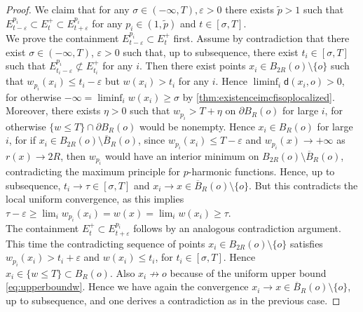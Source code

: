 \documentclass[a4paper,12pt,reqno]{amsart}
\numberwithin{equation}{section}
\theoremstyle{plain}
\theoremstyle{definition}
\theoremstyle{remark}
\newcommand{\eps}{\varepsilon}
\newcommand{\dist}{\mathsf{d}}
\begin{document}
{\begin{proof}
We claim that for any $\sigma \in (-\infty,T), \eps>0$ there exists $\tilde p>1$ such that $E^{p_i}_{t-\eps} \subset E_t^+ \subset E^{p_i}_{t+\eps}$ for any $p_i \in (1,\tilde p)$ and $t \in [\sigma, T]$.\\
We prove the containment $E^{p_i}_{t-\eps} \subset E_t^+$ first. Assume by contradiction that there exist $\sigma \in (-\infty, T)$, $\eps>0$ such that, up to subsequence, there exist $t_i \in [\sigma, T]$ such that $E^{p_i}_{t_i-\eps} \not\subset E_{t_i}^+$ for any $i$. Then there exist points $x_i \in B_{2R}(o) \setminus\{o\}$ such that $w_{p_i}(x_i) \le t_i-\eps$ but $w(x_i)>t_i$ for any $i$. Hence $\liminf_i \dist(x_i,o)>0$, for otherwise $-\infty = \liminf_i w(x_i) \ge \sigma$ by \cref{thm:existenceimcfisoplocalized}. Moreover, there exists $\eta>0$ such that $w_{p_i} > T + \eta$ on $\partial B_R(o)$ for large $i$, for otherwise $\{w \le T\} \cap \partial B_R(o)$ would be nonempty. Hence $x_i \in B_R(o)$ for large $i$, for if $x_i \in B_{2R}(o) \setminus \overline{B}_R(o)$, since $w_{p_i}(x_i) \le T-\eps$ and $w_{p_i}(x)\to+\infty$ as $r(x)\to2R$, then $w_{p_i}$ would have an interior minimum on $B_{2R}(o) \setminus\overline{B}_R(o)$, contradicting the maximum principle for $p$-harmonic functions. Hence, up to subsequence, $t_i\to \tau \in [\sigma, T]$ and $x_i\to x \in \overline{B}_R(o) \setminus\{o\}$. But this contradicts the local uniform convergence, as this implies $\tau-\eps \ge \lim_i w_{p_i}(x_i) = w(x)= \lim_i w(x_i) \ge \tau$.\\
The containment $E_t^+ \subset E^{p_i}_{t+\eps}$ follows by an analogous contradiction argument. This time the contradicting sequence of points $x_i \in B_{2R}(o)\setminus\{o\}$ satisfies $w_{p_i}(x_i)>t_i+\eps$ and $w(x_i) \le t_i$, for $t_i \in [\sigma, T]$. Hence $x_i \in \{w\le T\} \subset B_R(o)$. Also $x_i\not\to o$ because of the uniform upper bound \eqref{eq:upperboundw}. Hence we have again the convergence $x_i\to x \in \overline{B}_R(o) \setminus\{o\}$, up to subsequence, and one derives a contradiction as in the previous case.


\end{proof}}
\end{document}
